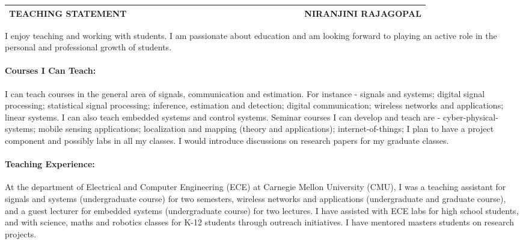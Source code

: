 \documentclass[10pt]{article}
\date{}
\begin{document}

\begin{table}
\color{blue}
\begin{tabular*}{\textwidth}{l r}
\large\textbf{TEACHING STATEMENT} & 
\hfill \ \ \ \ \ \ \ \ \ \ \ \ \ \ \ \ \ \ \ \
\ \ \ \ \ \ \ \ \ \ \ \ \ \ \ 
\large\textbf{NIRANJINI RAJAGOPAL}\\
\hline
\end{tabular*}

\end{table}


I enjoy teaching and working with students. I am passionate about education and am looking forward to playing an active role in the personal and professional growth of students. 


\paragraph{Courses I Can Teach:}
I can teach courses in the general area of signals, communication and estimation. For instance - signals and systems;  digital signal processing; statistical signal processing; inference, estimation and detection; digital communication; wireless networks and applications; linear systems. I can also teach embedded systems and control systems. 
Seminar courses I can develop and teach are - cyber-physical-systems; mobile sensing applications; localization and mapping (theory and applications); internet-of-things; 
I plan to have a project component and possibly labs in all my classes. I would introduce discussions on research papers for my graduate classes.

\paragraph{Teaching Experience:}
At the department of Electrical and Computer Engineering (ECE) at Carnegie Mellon University (CMU), I was a teaching assistant for signals and systems (undergraduate course) for two semesters, wireless networks and applications (undergraduate and graduate course), and a guest lecturer for embedded systems (undergraduate course) for two lectures. I have assisted with ECE labs for high school students, and with science, maths and robotics classes for K-12 students through outreach initiatives. I have mentored masters students on research projects. \\
\end{document}
